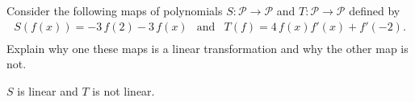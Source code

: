 
\begin{exerciseStatement}


Consider the following maps of polynomials \(S:\mathcal{P}\rightarrow\mathcal{P}\) and \(T:\mathcal{P}\rightarrow\mathcal{P}\) defined by 
\begin{align*} S(f(x))= -3 \, f\left(2\right) - 3 \, f\left(x\right)  & \text{and} & T(f)= 4 \, f\left(x\right) f'\left(x\right) + f'\left(-2\right) . \\ \end{align*}
             Explain why one these maps is a linear transformation and why the other map is not. 


\end{exerciseStatement}
    
\begin{exerciseAnswer} 


\(S\) is linear and \(T\) is not linear.


\end{exerciseAnswer}
    
